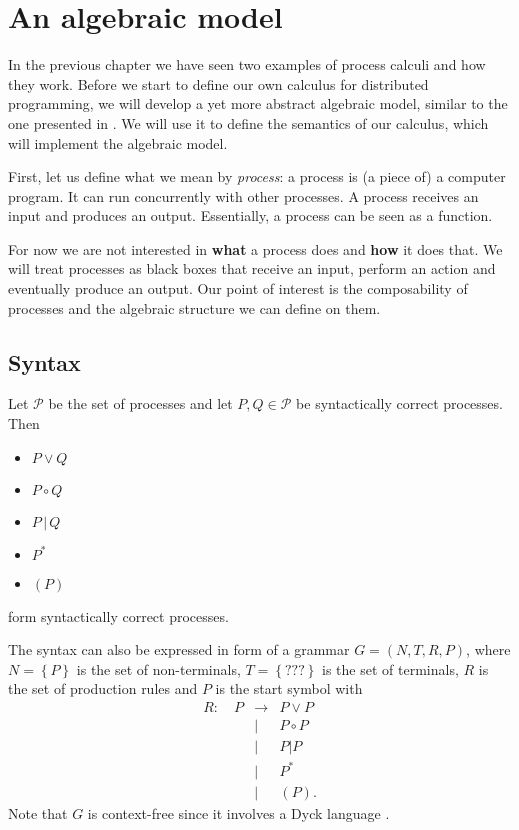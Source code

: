 \chapter{An algebraic model}
In the previous chapter we have seen two examples of process calculi and how they work. Before we start to define our own calculus for distributed programming, we will develop a yet more abstract algebraic model, similar to the one presented in \cite{Hoare:2012:LPU:2368298.2368301}. We will use it to define the semantics of our calculus, which will implement the algebraic model.

First, let us define what we mean by \textit{process}: a process is (a piece of) a computer program. It can run concurrently with other processes. A process receives an input and produces an output. Essentially, a process can be seen as a function. %

For now we are not interested in \textbf{what} a process does and \textbf{how} it does that. We will treat processes as black boxes that receive an input, perform an action and eventually produce an output. Our point of interest is the composability of processes and the algebraic structure we can define on them.

\section{Syntax}

Let $\mathcal{P}$ be the set of processes and let $P, Q \in \mathcal{P}$ be syntactically correct processes. Then
\begin{itemize}
  \item $P \vee Q$
  \vspace*{-0.25em}
  \item $P \circ Q$
  \vspace*{-0.25em}
  \item $P \,|\, Q$
  \vspace*{-0.25em}
  \item $P^*$
  \vspace*{-0.25em}
  \item $\left( P \right)$
\end{itemize}
form syntactically correct processes.

The syntax can also be expressed in form of a grammar $G = \left( N, T, R, P \right)$, where $N = \left\{ P \right\}$ is the set of non-terminals, $T = \left\{ ??? \right\}$ is the set of terminals, $R$ is the set of production rules and $P$ is the start symbol \cite{Hopcroft:2006:IAT:1196416} with
\begin{eqnarray*}
  R \colon \quad P & \to & P \vee P \\
    & | & P \circ P \\
    & | & P|P \\
    & | & P^* \\
    & | & \left( P \right).
\end{eqnarray*}
Note that $G$ is context-free since it involves a Dyck language \cite{}.

